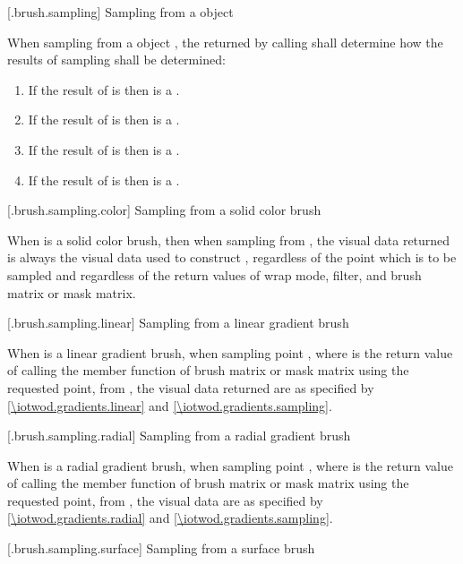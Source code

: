 [\iotwod.brush.sampling] {Sampling from a  object}

\pnum
When sampling from a  object , the  returned by calling  shall determine how the results of sampling shall be determined:
\begin{enumerate}
\item If the result of  is  then  is a .
\item If the result of  is  then  is a .
\item If the result of  is  then  is a .
\item If the result of  is  then  is a .
\end{enumerate}

 [\iotwod.brush.sampling.color] {Sampling from a solid color brush}

\pnum
When  is a solid color brush, then when sampling from , the visual data returned is always the visual data used to construct , regardless of the point which is to be sampled and regardless of the return values of wrap mode, filter, and brush matrix or mask matrix.

 [\iotwod.brush.sampling.linear] {Sampling from a linear gradient brush}

\pnum
When  is a linear gradient brush, when sampling point , where  is the return value of calling the  member function of brush matrix or mask matrix using the requested point, from , the visual data returned are as specified by \ref{\iotwod.gradients.linear} and \ref{\iotwod.gradients.sampling}.

 [\iotwod.brush.sampling.radial] {Sampling from a radial gradient brush}

\pnum
When  is a radial gradient brush, when sampling point , where  is the return value of calling the  member function of brush matrix or mask matrix using the requested point, from , the visual data are as specified by \ref{\iotwod.gradients.radial} and \ref{\iotwod.gradients.sampling}.

 [\iotwod.brush.sampling.surface] {Sampling from a surface brush}

